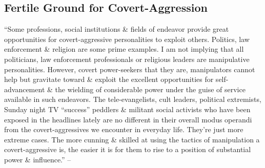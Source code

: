 \documentclass{article}
\numberwithin{equation}{section}
\begin{document}
\subsection{Fertile Ground for Covert-Aggression}
``Some professions, social institutions \& fields of endeavor provide great opportunities for covert-aggressive personalities to exploit others. Politics, law enforcement \& religion are some prime examples. I am not implying that all politicians, law enforcement professionals or religious leaders are manipulative personalities. However, covert power-seekers that they are, manipulators cannot help but gravitate toward \& exploit the excellent opportunities for self-advancement \& the wielding of considerable power under the guise of service available in such endeavors. The tele-evangelists, cult leaders, political extremists, Sunday night TV ``success'' peddlers \& militant social activists who have been exposed in the headlines lately are no different in their overall modus operandi from the covert-aggressives we encounter in everyday life. They're just more extreme cases. The more cunning \& skilled at using the tactics of manipulation a covert-aggressive is, the easier it is for them to rise to a position of substantial power \& influence.'' -- \cite[p. 46]{Simon2010}
\end{document}
